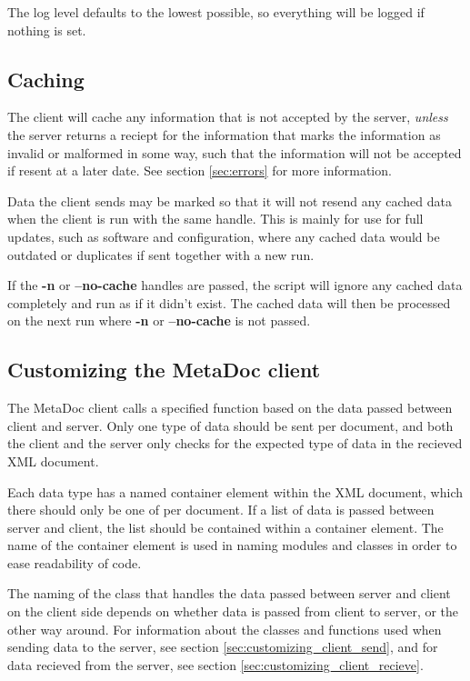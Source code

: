 The log level defaults to the lowest possible, so everything will be logged if
nothing is set.

\subsection{Caching}
\label{sec:caching}
The client will cache any information that is not accepted by the server, 
\textit{unless} the server returns a reciept for the information that marks the 
information as invalid or malformed in some way, such that the information will 
not be accepted if resent at a later date. See section \ref{sec:errors} for
more information.

Data the client sends may be marked so that it will not resend any cached data
when the client is run with the same handle. This is mainly for use for full
updates, such as software and configuration, where any cached data would be
outdated or duplicates if sent together with a new run.

If the \textbf{-n} or \textbf{--no-cache} handles are passed, the script will
ignore any cached data completely and run as if it didn't exist. The cached
data will then be processed on the next run where \textbf{-n} or
\textbf{--no-cache} is not passed.

\subsection{Customizing the MetaDoc client}
\label{sec:customizing_client}

The MetaDoc client calls a specified function based on the data passed between
client and server. Only one type of data should be sent per document, and both
the client and the server only checks for the expected type of data in the
recieved XML document. 

Each data type has a named container element within the XML document, which
there should only be one of per document. If a list of data is passed between
server and client, the list should be contained within a container element. The
name of the container element is used in naming modules and classes in order to
ease readability of code. 

The naming of the class that handles the data passed between server and client
on the client side depends on whether data is passed from client to server, or
the other way around. For information about the classes and functions used when
sending data to the server, see section \ref{sec:customizing_client_send}, and
for data recieved from the server, see section
\ref{sec:customizing_client_recieve}. 

